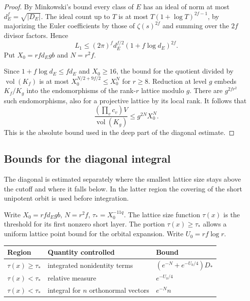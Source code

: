 \begin{proof}
By Minkowski's bound every class of \(E\) has an ideal of
norm at most \(d_E^f=\sqrt{|D_E|}\). The ideal count up to
\(T\) is at most \(T(1+\log T)^{2f-1}\), by majorizing the
Euler coefficients by those of \(\zeta(s)^{2f}\) and
summing over the \(2f\) divisor factors. Hence
\[
 L_1\le (2\pi)^f d_E^{f/2}(1+f\log d_E)^{2f}.
\]
Put \(X_0=rf d_E g b\) and \(N=r^2 f\).

Since
\(1+f\log d_E\le f d_E\) and \(X_0\ge16\), the bound for
the quotient divided by \(\operatorname{vol}(K_f)\) is at most
\(X_0^{N/2+9f/2}\le X_0^N\) for \(r\ge8\).
Reduction at level \(g\) embeds \(K_f/K_g\) into the
endomorphisms of the rank-\(r\) lattice modulo \(g\).
There are \(g^{2fr^2}\) such endomorphisms, also for a projective
lattice by its local rank. It follows that
\[
   \frac{(\prod_v c_v)V}{\operatorname{vol}(K_g)}
                        \le g^{2N}X_0^N .
\]
This is the absolute bound used in the deep part of the
diagonal estimate.
\end{proof}



\subsection{Bounds for the diagonal integral}

The diagonal is estimated separately where the smallest lattice size stays above the cutoff and where it falls below. In the latter region the covering of the short unipotent orbit is used before integration.

Write \(X_0=rf d_E g b\), \(N=r^2f\), \(\tau_*=X_0^{-11q}\).
The lattice size function \(\tau(x)\) is the threshold for its
first nonzero short layer. The portion \(\tau(x)\ge\tau_*\)
allows a uniform lattice point bound for the orbital expansion.
Write \(U_0=rf\log r\).
\begin{construction}
\begin{tabular}{@{}lll@{}}
\toprule
Region & Quantity controlled & Bound \\
\midrule
\(\tau(x)\ge\tau_*\) & integrated nonidentity terms &
       \((e^{-N}+e^{-U_0/4})D_*\)\\
\(\tau(x)<\tau_*\) & relative measure & \(e^{-U_0/4}\)\\
\(\tau(x)<\tau_*\) & integral for \(n\) orthonormal vectors & \(e^{-N}n\)\\
\bottomrule
\end{tabular}
\caption{Two estimates on the same quotient for \(q\ge1\) in Lemma~\ref{lem:diagonal-integral-bounds}. The final row uses an arbitrary finite family before taking the full trace.}\label{fig:two-trace-regions}
\end{construction}

